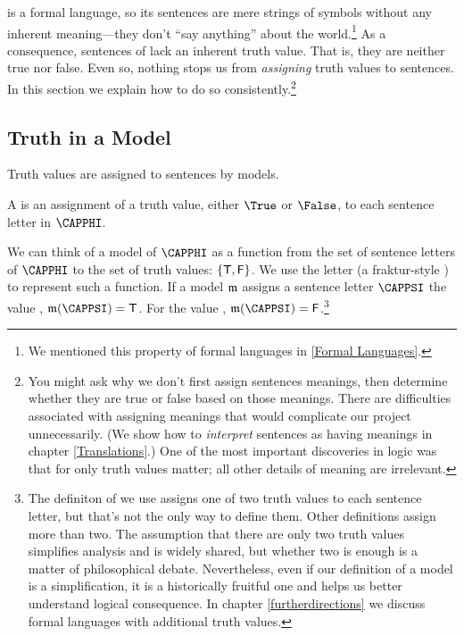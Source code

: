 \GSL{} is a formal language, so its sentences are mere strings of symbols without any inherent meaning---they don't ``say anything'' about the world.\footnote{
	We mentioned this property of formal languages in \ref{Formal Languages}.
}
As a consequence, sentences of \GSL{} lack an inherent truth value. That is, they are neither true nor false. 
Even so, nothing stops us from \emph{assigning} truth values to \GSL{} sentences. 
In this section we explain how to do so consistently.\footnote{
	You might ask why we don't first assign \GSL{} sentences meanings, then determine whether they are true or false based on those meanings. 
	There are difficulties associated with assigning meanings that would complicate our project unnecessarily. (We show how to \emph{interpret} \GSL{} sentences as having meanings in chapter \ref{Translations}.)
	One of the most important discoveries in logic was that for \GSL{} only truth values matter; all other details of meaning are irrelevant.
}

\subsection{Truth in a Model}\label{Truth in an Interpretation} 

Truth values are assigned to sentences by models.

\begin{majorILnc}{}
A  is an assignment of a truth value, either $\True$ or $\False$, to each sentence letter in $\CAPPHI$.
\end{majorILnc}

\noindent{}We can think of a model of $\CAPPHI$ as a function from the set of sentence letters of $\CAPPHI$ to the set of truth values: $\{\mathsf{T}, \mathsf{F}\}$. 
We use the letter \mention{$\IntA$} (a fraktur-style ) to represent such a function.
If a model $\IntA$ assigns a sentence letter $\CAPPSI$ the value \mention{$\True$}, $\IntA(\CAPPSI)=\TrueB$.
For the value \mention{$\False$}, $\IntA(\CAPPSI)=\FalseB$.\footnote{
	The definiton of  we use assigns one of two truth values to each sentence letter, but that's not the only way to define them. Other definitions assign more than two.
	The assumption that there are only two truth values simplifies analysis and is widely shared, but whether two is enough is a matter of philosophical debate.
	Nevertheless, even if our definition of a model is a simplification, it is a historically fruitful one and helps us better understand logical consequence.  In chapter \ref{furtherdirections} we discuss formal languages with additional truth values.
}

